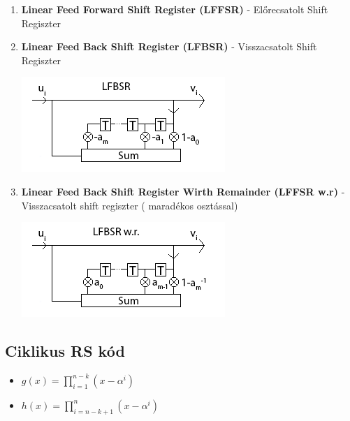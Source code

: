 	\begin{enumerate}
		\item \textbf{Linear Feed Forward Shift Register (LFFSR) } - Előrecsatolt Shift Regiszter

		\item \textbf{Linear Feed Back Shift Register (LFBSR) } - Visszacsatolt Shift Regiszter
			\begin{center}
				\includegraphics[scale=1]{img/LFBSR}
			\end{center}
		\item \textbf{Linear Feed Back Shift Register Wirth Remainder (LFFSR w.r) } - Visszacsatolt shift regiszter ( maradékos osztással)
			\begin{center}
				\includegraphics[scale=1]{img/LFBSRwr}
			\end{center}
	\end{enumerate}

\subsection{Ciklikus RS kód}

 	\begin{itemize}
 		\item $g(x) = \prod\limits_{i = 1}^{n-k} (x-\alpha^i)$
 		\item $h(x) = \prod\limits_{i = n-k+1}^{n} (x-\alpha^i)$
 	\end{itemize}

